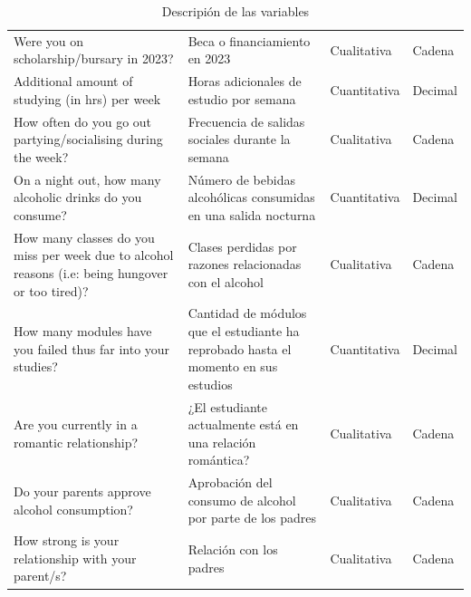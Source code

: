 \documentclass[a4paper,12pt]{article}
\begin{document}
\begin{table}[H]
{\begin{threeparttable}
\begin{tabularx}{\textwidth}{|p{}|p{}|p{}|X|}
        \rowcolor{gray!10} %
        Were you on scholarship/bursary in 2023?                                                         & Beca o financiamiento en 2023                                                       & Cualitativa  & Cadena       \\
        Additional amount of studying (in hrs) per week                                                  & Horas adicionales de estudio por semana                                             & Cuantitativa & Decimal      \\
        \rowcolor{gray!10} %
        How often do you go out partying/socialising during the week?                                    & Frecuencia de salidas sociales durante la semana                                    & Cualitativa  & Cadena       \\
        On a night out, how many alcoholic drinks do you consume?                                        & Número de bebidas alcohólicas consumidas en una salida nocturna                     & Cuantitativa & Decimal      \\
        \rowcolor{gray!10} %
        How many classes do you miss per week due to alcohol reasons (i.e: being hungover or too tired)? & Clases perdidas por razones relacionadas con el alcohol                             & Cualitativa  & Cadena       \\
        How many modules have you failed thus far into your studies?                                     & Cantidad de módulos que el estudiante ha reprobado hasta el momento en sus estudios & Cuantitativa & Decimal      \\
        \rowcolor{gray!10} %
        Are you currently in a romantic relationship?                                                    & ¿El estudiante actualmente está en una relación romántica?                          & Cualitativa  & Cadena       \\
        Do your parents approve alcohol consumption?                                                     & Aprobación del consumo de alcohol por parte de los padres                           & Cualitativa  & Cadena       \\
        \rowcolor{gray!10} %
        How strong is your relationship with your parent/s?                                              & Relación con los padres                                                             & Cualitativa  & Cadena       \\
        \hline
      \end{tabularx}
    \end{threeparttable}
  } %
  \caption{Descripión de las variables}
\end{table}
\end{document}

